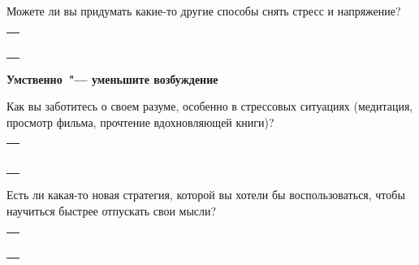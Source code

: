 \begin{itemize}
	\itemWritingHand Можете ли вы придумать какие-то другие способы снять стресс и напряжение?
\end{itemize}

\setlength{\extrarowheight}{2mm}
\begin{tabularx}{0.96\textwidth}{X}
	\\
	\arrayrulecolor{gray}\hline\\
	\hline\\
	\hline\\
	\hline\\
	\hline\\
	\hline\\
\end{tabularx}
\setlength{\extrarowheight}{0mm}

\vspace{5ex}

{\large \textbf{Умственно~"--- уменьшите возбуждение}}

\begin{itemize}
	\itemWritingHand Как вы заботитесь о своем разуме, особенно в стрессовых ситуациях (медитация, просмотр фильма, прочтение вдохновляющей книги)?
\end{itemize}

\setlength{\extrarowheight}{2mm}
\begin{tabularx}{0.96\textwidth}{X}
	\\
	\arrayrulecolor{gray}\hline\\
	\hline\\
	\hline\\
	\hline\\
	\hline\\
	\hline\\
	\hline\\
\end{tabularx}
\setlength{\extrarowheight}{0mm}
	
\begin{itemize}
	\itemWritingHand Есть ли какая-то новая стратегия, которой вы хотели бы воспользоваться, чтобы научиться быстрее отпускать свои мысли?
\end{itemize}

\setlength{\extrarowheight}{2mm}
\begin{tabularx}{0.96\textwidth}{X}
	\\
	\arrayrulecolor{gray}\hline\\
	\hline\\
	\hline\\
	\hline\\
	\hline\\
	\hline\\
\end{tabularx}
\setlength{\extrarowheight}{0mm}

